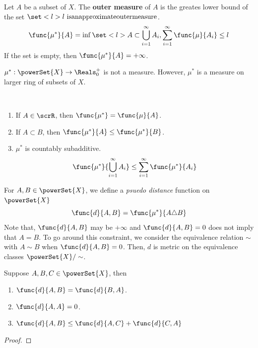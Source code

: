 \begin{definition}
    Let \(A\) be a subset of \(X\). The \textbf{outer measure} of \(A\) is the greates lower bound of the set \(\set<l>{l \ \mathrm{is an approximate outer measure}}\). 
    \begin{equation*}
        \func{\mu^{\ast}}{A} =  \inf \set<l>{A \subset \bigcup_{i= 1}^{\infty} A_i, \sum_{i = 1}^{\infty} \func{\mu}{A_i} \leq l}
    \end{equation*}
    If the set is empty, then \(\func{\mu^{\ast}}{A} = + \infty\).
\end{definition}

\begin{remark}
    \(\mu^{\ast}: \powerSet{X} \to \Reals^+_0\) is not a measure. However, \(\mu^{\ast}\) is a measure on larger ring of subsets of \(X\).
\end{remark}

\begin{proposition}
    \ 
    \begin{enumerate}
        \item If \(A \in \scrR\), then \(\func{\mu^{\ast}} = \func{\mu}{A}\).
        \item If \(A \subset B\), then \(\func{\mu^{\ast}}{A} \leq \func{\mu^{\ast}}{B}\).
        \item \(\mu^{\ast}\) is countably subadditive. 
        \begin{equation*}
            \func{\mu^{\ast}}{\bigcup_{i=1}^{\infty} A_i}  \leq \sum_{i = 1}^{\infty} \func{\mu^{\ast}}{A_i}
        \end{equation*}
    \end{enumerate}
\end{proposition}

For \(A,B \in \powerSet{X}\), we define a \textit{psuedo distance} function on \(\powerSet{X}\)
\begin{equation*}
    \func{d}{A,B} = \func{\mu^{\ast}}{A \triangle B}
\end{equation*}
Note that, \(\func{d}{A,B}\) may be \(+ \infty\) and \(\func{d}{A,B} = 0\) does not imply that \(A = B\). To go around this constraint, we consider the equivalence relation \(\sim\) with \(A \sim B\) when \(\func{d}{A,B} = 0\). Then, \(d\) is metric on the equivalence classes \(\powerSet{X}/\sim\).
\begin{proposition}
    Suppose \(A,B,C \in \powerSet{X}\), then 
    \begin{enumerate}
        \item \(\func{d}{A,B} = \func{d}{B,A}\).
        \item \(\func{d}{A,A} = 0\).
        \item \(\func{d}{A,B} \leq \func{d}{A,C} + \func{d}{C,A}\)
    \end{enumerate}
\end{proposition}
\begin{proof}
    
\end{proof}

